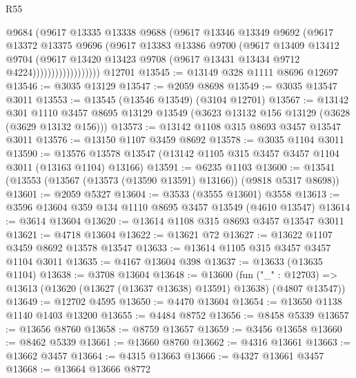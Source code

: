 \begin{lexlean}{R55}
\begin{coremodule}
                          @9684
                          (@9617
                            @13335
                            @13338
                            @9688
                            (@9617
                              @13346
                              @13349
                              @9692
                              (@9617
                                @13372
                                @13375
                                @9696
                                (@9617
                                  @13383
                                  @13386
                                  @9700
                                  (@9617
                                    @13409
                                    @13412
                                    @9704
                                    (@9617
                                      @13420
                                      @13423
                                      @9708
                                      (@9617 @13431 @13434 @9712 @4224))))))))))))))))))
    @12701
@13545 := @13149 @328 @1111 @8696 @12697
@13546 := @3035 @13129
@13547 := @2059 @8698
@13549 := @3035 @13547 @3011
@13553 := @13545 (@13546 @13549) (@3104 @12701)
@13567 := @13142
    @301
    @1110
    @3457
    @8695
    @13129
    @13549
    (@3623 @13132 @156 @13129 (@3628 (@3629 @13132 @156)))
@13573 := @13142 @1108 @315 @8693 @3457 @13547 @3011
@13576 := @13150 @1107 @3459 @8692
@13578 := @3035 @1104 @3011
@13590 := @13576 @13578 @13547 (@13142 @1105 @315 @3457 @3457 @1104 @3011 (@13163 @1104) @13166)
@13591 := @6235 @1103
@13600 := @13541 (@13553 (@13567 (@13573 (@13590 @13591) @13166)) (@9818 @5317 @8698))
@13601 := @2059 @5327
@13604 := @3533 (@3555 @13601) @3558
@13613 := @3596 @13604 @359 @134 @1110 @8695 @3457 @13549 (@4610 @13547)
@13614 := @3614 @13604
@13620 := @13614 @1108 @315 @8693 @3457 @13547 @3011
@13621 := @4718 @13604
@13622 := @13621 @72
@13627 := @13622 @1107 @3459 @8692 @13578 @13547
@13633 := @13614 @1105 @315 @3457 @3457 @1104 @3011
@13635 := @4167 @13604 @398
@13637 := @13633 (@13635 @1104)
@13638 := @3708 @13604
@13648 := @13600
    (fun ("_" : @12703) => @13613 (@13620 (@13627 (@13637 @13638) @13591) @13638) (@4807 @13547))
@13649 := @12702 @4595
@13650 := @4470 @13604
@13654 := @13650 @1138 @1140 @1403 @13200
@13655 := @4484 @8752
@13656 := @8458 @5339
@13657 := @13656 @8760
@13658 := @8759 @13657
@13659 := @3456 @13658
@13660 := @8462 @5339
@13661 := @13660 @8760
@13662 := @4316 @13661
@13663 := @13662 @3457
@13664 := @4315 @13663
@13666 := @4327 @13661 @3457
@13668 := @13664 @13666 @8772

\end{coremodule}
\end{lexlean}
